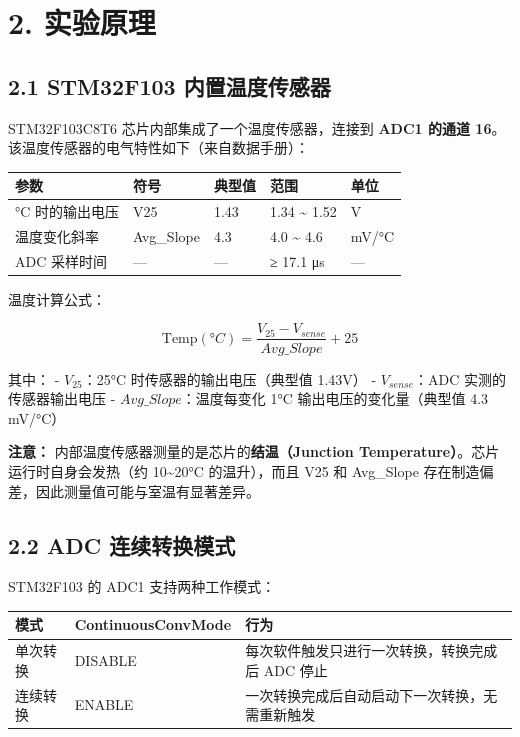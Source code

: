 \documentclass[
  chinese,
  UTF8,
  oneside,
  openany]{ctexbook}
\begin{document}
\section{2. 实验原理}\label{ux5b9eux9a8cux539fux7406-1}

\subsection{2.1 STM32F103
内置温度传感器}\label{stm32f103-ux5185ux7f6eux6e29ux5ea6ux4f20ux611fux5668-1}

STM32F103C8T6 芯片内部集成了一个温度传感器，连接到 \textbf{ADC1 的通道
16}。该温度传感器的电气特性如下（来自数据手册）：

\begin{longtable}[]{@{}lllll@{}}
\toprule\noalign{}
参数 & 符号 & 典型值 & 范围 & 单位 \\
\midrule\noalign{}
\endhead
\bottomrule\noalign{}
\endlastfoot
25°C 时的输出电压 & V25 & 1.43 & 1.34 \textasciitilde{} 1.52 & V \\
温度变化斜率 & Avg\_Slope & 4.3 & 4.0 \textasciitilde{} 4.6 & mV/°C \\
ADC 采样时间 & --- & --- & ≥ 17.1 μs & --- \\
\end{longtable}

温度计算公式：

\[\text{Temp}(°C) = \frac{V_{25} - V_{sense}}{Avg\_Slope} + 25\]

其中： - \(V_{25}\)：25°C 时传感器的输出电压（典型值 1.43V） -
\(V_{sense}\)：ADC 实测的传感器输出电压 - \(Avg\_Slope\)：温度每变化 1°C
输出电压的变化量（典型值 4.3 mV/°C）

\textbf{注意：} 内部温度传感器测量的是芯片的\textbf{结温（Junction
Temperature）}。芯片运行时自身会发热（约 10\textasciitilde20°C
的温升），而且 V25 和 Avg\_Slope
存在制造偏差，因此测量值可能与室温有显著差异。

\subsection{2.2 ADC
连续转换模式}\label{adc-ux8fdeux7eedux8f6cux6362ux6a21ux5f0f}

STM32F103 的 ADC1 支持两种工作模式：

\begin{longtable}[]{@{}lll@{}}
\toprule\noalign{}
模式 & ContinuousConvMode & 行为 \\
\midrule\noalign{}
\endhead
\bottomrule\noalign{}
\endlastfoot
单次转换 & DISABLE & 每次软件触发只进行一次转换，转换完成后 ADC 停止 \\
连续转换 & ENABLE & 一次转换完成后自动启动下一次转换，无需重新触发 \\
\end{longtable}
\end{document}

